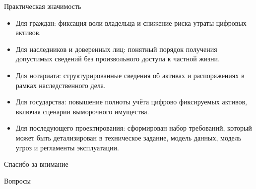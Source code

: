 \documentclass{beamer}
\newcommand{\smallitem}{\setlength{\itemsep}{0.35em}}
\begin{document}
\begin{frame}{Практическая значимость}
  \footnotesize
  \begin{itemize}
    \smallitem
    \item Для граждан: фиксация воли владельца и снижение риска утраты цифровых активов.
    \item Для наследников и доверенных лиц: понятный порядок получения допустимых сведений без произвольного доступа к частной жизни.
    \item Для нотариата: структурированные сведения об активах и распоряжениях в рамках наследственного дела.
    \item Для государства: повышение полноты учёта цифрово фиксируемых активов, включая сценарии выморочного имущества.
    \item Для последующего проектирования: сформирован набор требований, который может быть детализирован в техническое задание, модель данных, модель угроз и регламенты эксплуатации.
  \end{itemize}
\end{frame}

\begin{frame}[plain]
  \centering
  \vspace{1.2cm}
  {\Huge Спасибо за внимание}

  \vspace{0.8cm}
  {\Large Вопросы}
\end{frame}
\end{document}
